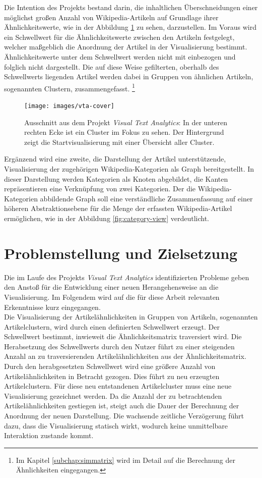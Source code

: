 Die Intention des Projekts bestand darin, die inhaltlichen Überschneidungen einer möglichst großen Anzahl von Wikipedia-Artikeln auf Grundlage ihrer Ähnlichkeitswerte, wie in der Abbildung \ref{fig:vta-cover} zu sehen, darzustellen.
Im Voraus wird ein Schwellwert für die Ähnlichkeitswerte zwischen den Artikeln festgelegt, welcher maßgeblich die Anordnung der Artikel in der Visualisierung bestimmt.
Ähnlichkeitswerte unter dem Schwellwert werden nicht mit einbezogen und folglich nicht dargestellt. 
Die auf diese Weise gefilterten, oberhalb des Schwellwerts liegenden Artikel werden dabei in Gruppen von ähnlichen Artikeln, sogenannten Clustern, zusammengefasst.
\footnote{Im Kapitel \ref{subchap:simmatrix} wird im Detail auf die Berechnung der Ähnlichkeiten eingegangen.}

\begin{figure}[ht]
\centering
\texttt{[image: images/vta-cover]}
\caption{Ausschnitt aus dem Projekt \textit{Visual Text Analytics}: In der unteren rechten Ecke ist ein Cluster im Fokus zu sehen. Der Hintergrund zeigt die Startvisualisierung mit einer Übersicht aller Cluster.}
\label{fig:vta-cover}
\end{figure}

Ergänzend wird eine zweite, die Darstellung der Artikel unterstützende, Visualisierung der zugehörigen Wikipedia-Kategorien als Graph bereitgestellt.
In dieser Darstellung werden Kategorien als Knoten abgebildet, die Kanten repräsentieren eine Verknüpfung von zwei Kategorien.
Der die Wikipedia-Kategorien abbildende Graph soll eine verständliche Zusammenfassung auf einer höheren Abstraktionsebene für die Menge der erfassten Wikipedia-Artikel ermöglichen, wie in der Abbildung \ref{fig:category-view} verdeutlicht.


\section{Problemstellung und Zielsetzung}
Die im Laufe des Projekts \emph{Visual Text Analytics} identifizierten Probleme geben den Anstoß für die Entwicklung einer neuen Herangehensweise an die Visualisierung.
Im Folgendem wird auf die für diese Arbeit relevanten Erkenntnisse kurz eingegangen.\\
Die Visualisierung der Artikelähnlichkeiten in Gruppen von Artikeln, sogenannten Artikelclustern, wird durch einen definierten Schwellwert erzeugt.
Der Schwellwert bestimmt, inwieweit die Ähnlichkeitsmatrix traversiert wird.
Die Herabsetzung des Schwellwerts durch den Nutzer führt zu einer steigenden Anzahl an zu traversierenden Artikelähnlichkeiten aus der Ähnlichkeitsmatrix.
Durch den herabgesetzten Schwellwert wird eine größere Anzahl von Artikelähnlichkeiten in Betracht gezogen.
Dies führt zu neu erzeugten Artikelclustern.
Für diese neu entstandenen Artikelcluster muss eine neue Visualisierung gezeichnet werden.
Da die Anzahl der zu betrachtenden Artikelähnlichkeiten gestiegen ist, steigt auch die Dauer der Berechnung der Anordnung der neuen Darstellung.
Die wachsende zeitliche Verzögerung führt dazu, dass die Visualisierung statisch wirkt, wodurch keine unmittelbare Interaktion zustande kommt.

